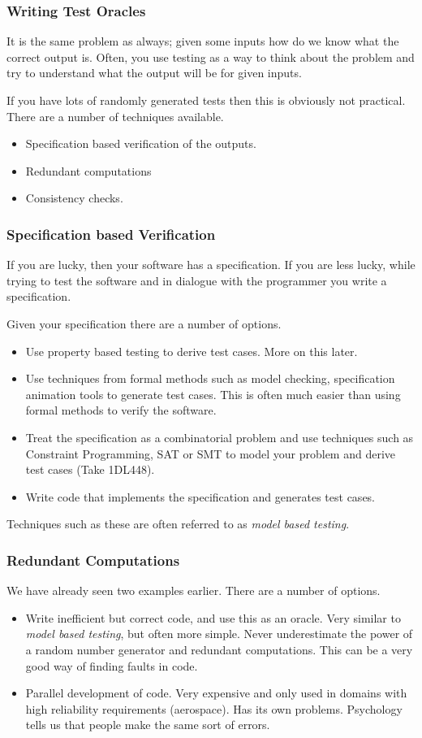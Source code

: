 \documentclass{beamer}
\begin{document}
\begin{frame}
  \frametitle{Writing Test Oracles}
  It is the same problem as always; given some inputs how do we know what
  the correct output is. Often, you use testing as a way to think about the
  problem and try to understand what the output will be for given inputs.

  If you have lots of randomly generated tests then this is obviously
  not practical. There are a number of techniques available. 
  \begin{itemize}
  \item Specification based verification of the outputs.
  \item Redundant computations
  \item Consistency checks.
  \end{itemize}
\end{frame}
\begin{frame}
  \frametitle{Specification based Verification}
  If you are lucky, then your software has a specification. If you are less lucky,
 while trying to test the software and in dialogue with the programmer you
 write a specification.

 Given your specification there are a number of options.
  \begin{itemize}
  \item Use property based testing to derive test cases. More on this later.
  \item Use techniques from formal methods such as model checking,
    specification animation tools to generate test cases. This is often much
    easier than using formal methods to verify the software.
  \item Treat the specification as a combinatorial problem and use
    techniques such as Constraint Programming, SAT or SMT to model
    your problem and derive test cases (Take 1DL448).
  \item Write code that implements the specification and generates test cases.
  \end{itemize}
Techniques such as these are often referred to as {\it model based testing}.
\end{frame}
\begin{frame}
  \frametitle{Redundant Computations}
  We have already seen two examples earlier. There are a number of options.
  \begin{itemize}
  \item Write inefficient but correct code, and use this as an
    oracle. Very similar to {\it model based testing}, but often more
    simple. Never underestimate the power of a random number generator
    and redundant computations. This can be a very good way of finding
    faults in code.
  \item Parallel development of code. Very expensive and only used in
    domains with high reliability requirements (aerospace). Has its
    own problems. Psychology tells us that people make the same sort
    of errors.
  \end{itemize}

\end{frame}
\end{document}
